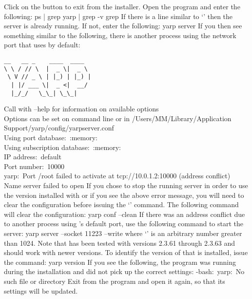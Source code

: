 Click on the  button to exit from the installer.
\newpage
\tertiaryEnd{}
Open the  program and enter the following:
\outputBegin{}
ps | grep yarp | grep -v grep
\outputEnd{}
If there is a line similar to `'
then the \yarp{} server is already running. If not, enter the following:
\outputBegin{}
yarp server
\outputEnd{}
If you then see something similar to the following, there is another process using the
network port that \yarp{} uses by default:
\outputBegin{}
\begin{verbatim}
__   __ _    ____  ____  
\ \ / // \  |  _ \|  _ \ 
 \ V // _ \ | |_) | |_) |
  | |/ ___ \|  _ <|  __/ 
  |_/_/   \_\_| \_\_|    
\end{verbatim}
Call with --help for information on available options\\
Options can be set on command line or in /Users/M\textunderscore{}M/Library/Application\\
\hspace*{5em}Support/yarp/config/yarpserver.conf\\
Using port database:\ :memory:\\
Using subscription database:\ :memory:\\
IP address:\ default\\
Port number:\ 10000\\
yarp:\ Port /root failed to activate at tcp://10.0.1.2:10000 (address conflict)\\
Name server failed to open
\outputEnd{}
If you chose to stop the running \yarp{} server in order to use the version installed with
\mplusm{} or if you see the above error message, you will need to clear the \yarp{}
configuration before issuing the `\asCode{yarp~server}' command.
The following command will clear the \yarp{} configuration:
\outputBegin{}
yarp conf --clean
\outputEnd{}
If there was an address conflict due to another process using \yarp's default port, use
the following command to start the \yarp{} server:
\outputBegin{}
yarp server --socket 11223 --write
\outputEnd{}
where `' is an arbitrary number greater than 1024.
Note that \mplusm{} has been tested with \yarp{} versions 2.3.61 through 2.3.63 and should
work with newer versions.
To identify the version of \yarp{} that is installed, issue the command:
\outputBegin{}
yarp version
\outputEnd{}
If you see the following, the  program was running during the
installation and did not pick up the correct settings:
\outputBegin{}
-bash:\ yarp:\ No such file or directory
\outputEnd{}
Exit from the  program and open it again, so that its settings will be
updated.\\

